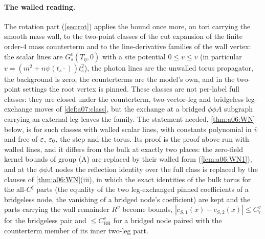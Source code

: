 \paragraph{The walled reading.} The rotation part (\cref{sec:rot}) applies the bound \cite[(1.33)]{Ba3} once more, on tori carrying the smooth mass wall, to the two-point classes of the cut expansion of the finite order-$4$ mass counterterm and to the line-derivative families of the wall vertex: the scalar lines are $G^v_s(T_\eta,0)$ with a site potential $0\le v\le\bar v$ (in particular $v=(m^2+n\psi(t_s\cdot))t_s^2$), the photon lines are the unwalled torus propagator, the background is zero, the counterterms are the model's own, and in the two-point settings the root vertex is pinned. These classes are not per-label full classes: they are closed under the counterterm, two-vector-leg and bridgeless leg-exchange moves of \cref{def:a07:class}, but the exchange at a bridged $\phi\phi A$ subgraph carrying an external leg leaves the family. The statement needed, \cref{thm:a06:WN} below, is \cite[(1.33)]{Ba3} for such classes with walled scalar lines, with constants polynomial in $\bar v$ and free of $\varepsilon$, $\varepsilon_0$, the step and the torus. Its proof is the proof above run with walled lines, and it differs from the bulk at exactly two places: the zero-field kernel bounds of group (A) are replaced by their walled form (\cref{lem:a06:WN1}), and at the $\phi\phi A$ nodes the reflection identity over the full class is replaced by the clauses of \cref{thm:a06:WN}(iii), in which the exact identities of the bulk torus for the all-$C^\xi$ parts (the equality of the two leg-exchanged pinned coefficients of a bridgeless node, the vanishing of a bridged node's coefficient) are kept and the parts carrying the wall remainder $R^v$ become bounds, $|c_{S,1}(x)-c_{S,2}(x)|\le C^v_7$ for the bridgeless pair and $\le C^v_{\mathrm{BR}}$ for a bridged node paired with the counterterm member of its inner two-leg part.





